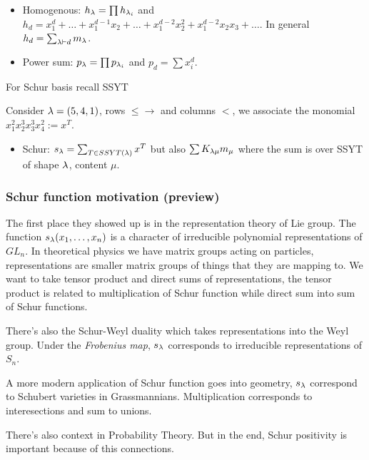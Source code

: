 \documentclass[12pt]{memoir}
\begin{document}
\begin{itemize}
    
    \item Homogenous: $h_\lambda=\prod h_{\lambda_i}$ and $h_d=x_1^d+\dots+x_1^{d-1}x_2+\dots+x_1^{d-2}x_2^2+x_1^{d-2}x_2x_3+\dots$. In general $h_d=\sum_{\lambda\vdash d}m_\lambda$.
    \item Power sum: $p_\lambda=\prod p_{\lambda_i}$ and $p_d=\sum x_i^d$.
\end{itemize}

For Schur basis recall SSYT 

\begin{Ex}
    Consider $\lambda=(5,4,1)$, rows $\leq\to$ and columns $<$, we associate the monomial $x_1^2x_2^3x_3^3x_4^2:=x^T$.
\end{Ex}

\begin{itemize}
    \itemsep=-0.4em
    \item Schur: $s_\lambda=\sum_{T\in SSYT(\lambda)}x^T$ but also $\sum K_{\lambda\mu}m_\mu$ where the sum is over SSYT of shape $\lambda$, content $\mu$.
\end{itemize}

\subsubsection{Schur function motivation (preview)}

The first place they showed up is in the representation theory of Lie group.  The function $s_\lambda(x_1,\dots,x_n)$ is a character of irreducible polynomial representations of $GL_n$. In theoretical physics we have matrix groups acting on particles, representations are smaller matrix groups of things that they are mapping to. We want to take tensor product and direct sums of representations, the tensor product is related to multiplication of Schur function while direct sum into sum of Schur functions.\par 
There's also the Schur-Weyl duality which takes representations into the Weyl group. Under the \emph{Frobenius map}, $s_\lambda$ corresponds to irreducible representations of $S_n$.\par 
A more modern application of Schur function goes into geometry, $s_\lambda$ correspond to Schubert varieties in Grassmannians. Multiplication corresponds to interesections and sum to unions.\par 
There's also context in Probability Theory. But in the end, Schur positivity is important because of this connections. 
\end{document}
